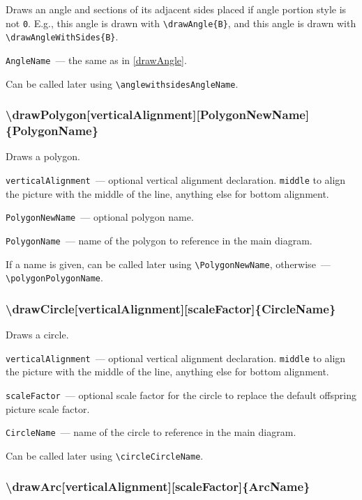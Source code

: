 	Draws an angle and sections of its adjacent sides placed if angle portion style is not \texttt{0}. E.g., this angle  is drawn with \texttt{\textbackslash drawAngle\{B\}}, and this angle  is drawn with \texttt{\textbackslash drawAngleWithSides\{B\}}. 

	\texttt{AngleName}~— the same as in \ref{drawAngle}.
	
	Can be called later using \texttt{\textbackslash anglewithsidesAngleName}.
	
\subsubsection{\textbackslash drawPolygon[verticalAlignment][PolygonNewName]\{PolygonName\}}

	Draws a polygon.

	\texttt{verticalAlignment}~— optional vertical alignment declaration. \texttt{middle} to align the picture with the middle of the line, anything else for bottom alignment.

	\texttt{PolygonNewName}~— optional polygon name. 
	
	\texttt{PolygonName}~— name of the polygon to reference in the main diagram. 
	
	If a name is given, can be called later using \texttt{\textbackslash PolygonNewName}, otherwise~— \texttt{\textbackslash polygonPolygonName}. 
	
\subsubsection{\textbackslash drawCircle[verticalAlignment][scaleFactor]\{CircleName\}}

	Draws a circle.

	\texttt{verticalAlignment}~— optional vertical alignment declaration. \texttt{middle} to align the picture with the middle of the line, anything else for bottom alignment.
	
	\texttt{scaleFactor}~— optional scale factor for the circle to replace the default offspring picture scale factor. 
	
	\texttt{CircleName}~— name of the circle to reference in the main diagram. 
	
	Can be called later using \texttt{\textbackslash circleCircleName}.
	
\subsubsection{\textbackslash drawArc[verticalAlignment][scaleFactor]\{ArcName\}}

